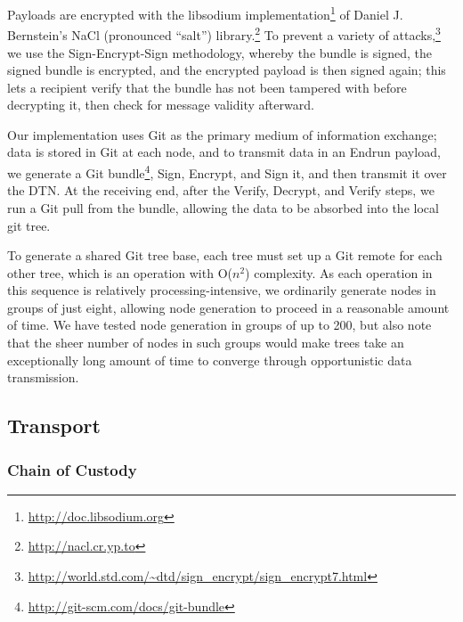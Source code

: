 \documentclass[12pt]{article}
\begin{document}
    Payloads are encrypted with the libsodium implementation\footnote{\url{http://doc.libsodium.org}} of Daniel J. Bernstein's NaCl (pronounced ``salt'') library.\footnote{\url{http://nacl.cr.yp.to}} To prevent a variety of attacks,\footnote{\url{http://world.std.com/~dtd/sign_encrypt/sign_encrypt7.html}} we use the Sign-Encrypt-Sign methodology, whereby the bundle is signed, the signed bundle is encrypted, and the encrypted payload is then signed again; this lets a recipient verify that the bundle has not been tampered with before decrypting it, then check for message validity afterward.
    
    Our implementation uses Git as the primary medium of information exchange; data is stored in Git at each node, and to transmit data in an Endrun payload, we generate a Git bundle\footnote{\url{http://git-scm.com/docs/git-bundle}}, Sign, Encrypt, and Sign it, and then transmit it over the DTN. At the receiving end, after the Verify, Decrypt, and Verify steps, we run a Git pull from the bundle, allowing the data to be absorbed into the local git tree.
    
    To generate a shared Git tree base, each tree must set up a Git remote for each other tree, which is an operation with O($n^2$) complexity. As each operation in this sequence is relatively processing-intensive, we ordinarily generate nodes in groups of just eight, allowing node generation to proceed in a reasonable amount of time. We have tested node generation in groups of up to 200, but also note that the sheer number of nodes in such groups would make trees take an exceptionally long amount of time to converge through opportunistic data transmission.
    
  \subsection{Transport}
  \label{subsec:transport}
  
  \subsubsection{Chain of Custody}
  \label{subsec:chainofcustody}
  
\end{document}

